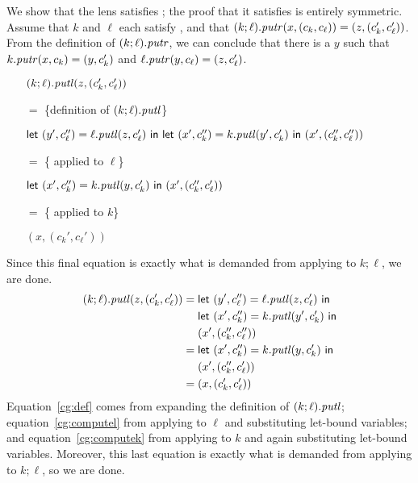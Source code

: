 \begin{defn}[$R$-similarity]
\begin{theorem}
\iffull
\begin{goodlens}
We show that the lens satisfies ; the proof that it satisfies
 is entirely symmetric. Assume that $k$ and $\ell$ each satisfy
, and that $(k;\ell).\mathit{putr}(x,(c_k,c_\ell))=(z,(c_k',c_\ell'))$.
From the definition of $(k;\ell).\mathit{putr}$, we can conclude that there is a $y$
such that $k.\mathit{putr}(x,c_k)=(y,c_k')$ and $\ell.\mathit{putr}(y,c_\ell)=(z,c_\ell')$.
\ifcomplement
\begin{itemize}
    \item[]
        $(k;\ell).\mathit{putl}(z,(c_k',c_\ell'))$
    \item[$=$] \{definition of $(k;\ell).\mathit{putl}$\}
    \item[]
        $\mathsf{let}\  (y', c_\ell'') = \ell.\mathit{putl}(z, c_\ell') \ \mathsf{in}\ 
         \mathsf{let}\  (x', c_k'') = k.\mathit{putl}(y', c_k') \ \mathsf{in}\ 
         (x', (c_k'', c_\ell''))$
    \item[$=$] \{ applied to $\ell$\}
    \item[]
        $\mathsf{let}\  (x', c_k'') = k.\mathit{putl}(y, c_k') \ \mathsf{in}\ 
         (x', (c_k'', c_\ell'))$
    \item[$=$] \{ applied to $k$\}
    \item[] $(x, (c_k', c_\ell'))$
\end{itemize}
Since this final equation is exactly what is demanded from applying
 to $k;\ell$, we are done.
\else%
\begin{align}
    (k;\ell).\putl(z,(c_k',c_\ell')) ={}
    & \mllet (y', c_\ell'') = \ell.\putl(z, c_\ell') \mline \label{cg:def}\\
    & \mllet (x', c_k'') = k.\putl(y', c_k') \mline \nonumber\\
    & (x', (c_k'', c_\ell'')) \nonumber\\
    ={}
    & \mllet (x', c_k'') = k.\putl(y, c_k') \mline \label{cg:computel}\\
    & (x', (c_k'', c_\ell')) \nonumber\\
    ={}
    & (x, (c_k', c_\ell')) \label{cg:computek}
\end{align}
Equation~\ref{cg:def} comes from expanding the definition of
$(k;\ell).\mathit{putl}$; equation~\ref{cg:computel} from applying  to
$\ell$ and substituting let-bound variables; and equation~\ref{cg:computek}
from applying  to $k$ and again substituting let-bound variables.
Moreover, this last equation is exactly what is demanded from applying
 to $k;\ell$, so we are done.
\fi%
\end{goodlens}
\fi


\end{theorem}
\end{defn}
